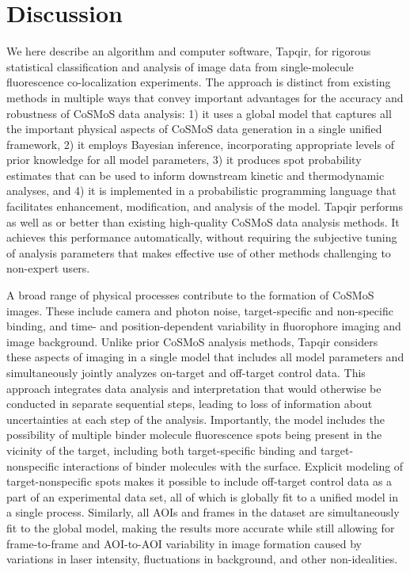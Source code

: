 \section*{Discussion}

We here describe an algorithm and computer software, Tapqir, for rigorous statistical classification and analysis of image data from single-molecule fluorescence co-localization experiments. The approach is distinct from existing methods in multiple ways that convey important advantages for the accuracy and robustness of CoSMoS data analysis: 1) it uses a global model that captures all the important physical aspects of CoSMoS data generation in a single unified framework, 2) it employs Bayesian inference, incorporating appropriate levels of prior knowledge for all model parameters, 3) it produces spot probability estimates that can be used to inform downstream kinetic and thermodynamic analyses, and 4) it is implemented in a probabilistic programming language that facilitates enhancement, modification, and analysis of the model. Tapqir performs as well as or better than  existing high-quality CoSMoS data analysis methods. It achieves this performance automatically, without requiring the subjective tuning of analysis parameters that makes effective use of other methods challenging to non-expert users.

A broad range of physical processes contribute to the formation of CoSMoS images. These include camera and photon noise, target-specific and non-specific binding, and time- and position-dependent variability in fluorophore imaging and image background. Unlike prior CoSMoS analysis methods, Tapqir considers these aspects of imaging in a single model that includes all model parameters and simultaneously jointly analyzes on-target and off-target control data.  This approach integrates data analysis and interpretation that would otherwise be conducted in separate sequential steps, leading to loss of information about uncertainties at each step of the analysis. Importantly, the model includes the possibility of multiple binder molecule fluorescence spots being present in the vicinity of the target, including both target-specific binding and target-nonspecific interactions of binder molecules with the surface. Explicit modeling of target-nonspecific spots makes it possible to include off-target control data as a part of an experimental data set, all of which is globally fit to a unified model in a single process.  Similarly, all AOIs and frames in the dataset are simultaneously fit to the global model, making the results more accurate while still allowing for frame-to-frame and AOI-to-AOI variability in image formation caused by variations in laser intensity, fluctuations in background, and other non-idealities.

